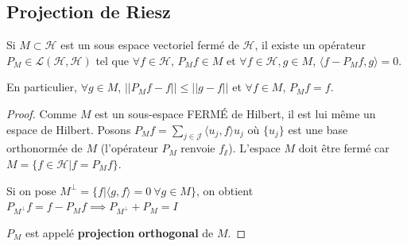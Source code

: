 \subsection{Projection de Riesz}
\begin{theo}[Projection]
    Si $M \subset \mathcal{H}$ est un sous espace vectoriel fermé de $\mathcal{H}$, il existe un opérateur $P_M \in \mathcal{L}(\mathcal{H},\mathcal{H})$ tel que $\forall f\in\mathcal{H}$, $P_Mf \in M$ et $\forall f \in \mathcal{H},g\in M$, $\langle f-P_Mf,g\rangle=0$.
    
    En particulier, $\forall g\in M$, $||P_Mf-f||\leq||g-f||$ et $\forall f \in M$, $P_Mf = f$.
\end{theo}
\begin{proof}
    Comme $M$ est un sous-espace FERMÉ de Hilbert, il est lui même un espace de Hilbert. Posons $P_Mf = \sum_{j\in\mathcal{J}} \langle u_j,f\rangle u_j$ où $\{u_j\}$ est une base orthonormée de $M$ (l'opérateur $P_M$ renvoie $f_\sslash$). L'espace $M$ doit être fermé car $M=\{f\in\mathcal{H}\big|f=P_Mf\}$.
    
    Si on pose $M^\bot = \{f\big|\langle g,f\rangle=0 \ \forall g\in M\}$, on obtient $P_{M^\bot}f=f - P_Mf \implies P_{M^\bot} + P_M = I$
    
    $P_M$ est appelé \textbf{projection orthogonal} de $M$. 
\end{proof}

